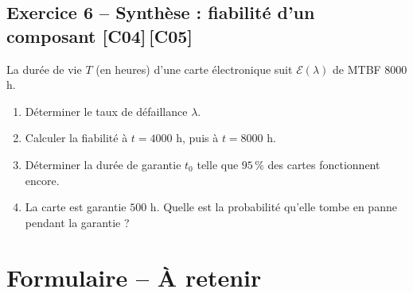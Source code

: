 \documentclass[a4paper,11pt]{article}
\begin{document}
\subsection*{Exercice 6 -- Synthèse : fiabilité d'un composant \hfill {\normalsize\color{uimmred}[C04]\,[C05]}}
La durée de vie $T$ (en heures) d'une carte électronique suit $\mathcal{E}(\lambda)$ de MTBF $8000$ h.
\begin{enumerate}[label=\alph*)]
  \item Déterminer le taux de défaillance $\lambda$.
  \item Calculer la fiabilité à $t = 4000$ h, puis à $t = 8000$ h.
  \item Déterminer la durée de garantie $t_0$ telle que $95\,\%$ des cartes fonctionnent encore.
  \item La carte est garantie $500$ h. Quelle est la probabilité qu'elle tombe en panne pendant la garantie ?
\end{enumerate}

\newpage
\section*{Formulaire -- À retenir}
\end{document}
